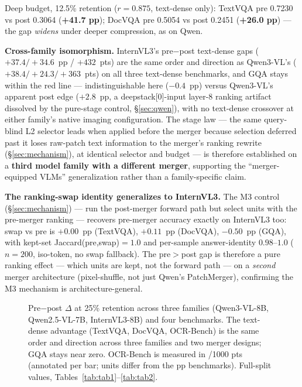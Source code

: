 \documentclass[sigconf,review,anonymous]{acmart}
\begin{document}
Deep budget, 12.5\% retention ($r = 0.875$, text-dense only): TextVQA pre 0.7230
vs post 0.3064 (\textbf{+41.7 pp}); DocVQA pre 0.5054 vs post 0.2451
(\textbf{+26.0 pp}) --- the gap \emph{widens} under deeper compression, as on
Qwen.

\textbf{Cross-family isomorphism.} InternVL3's pre$-$post text-dense gaps
($+37.4 / +34.6$~pp / $+432$~pts) are the same order and direction as
Qwen3-VL's ($+38.4 / +24.3 / +363$~pts) on all three text-dense benchmarks, and
GQA stays within the red line --- indistinguishable here ($-0.4$~pp) versus
Qwen3-VL's apparent post edge ($+2.8$~pp, a deepstack[0]-input layer-8 ranking
artifact dissolved by the pure-stage control, \S\ref{sec:qwen}), with no
text-dense crossover at either family's native imaging configuration. The stage law --- the same query-blind L2
selector leads when applied before the merger because selection deferred past it
loses raw-patch text information to the merger's ranking rewrite
(\S\ref{sec:mechanism}), at identical selector and budget --- is therefore
established on a \textbf{third model family with a different merger}, supporting
the ``merger-equipped VLMs'' generalization rather than a family-specific claim.

\textbf{The ranking-swap identity generalizes to InternVL3.} The M3 control
(\S\ref{sec:mechanism}) --- run the post-merger forward path but select units
with the pre-merger ranking --- recovers pre-merger accuracy exactly on
InternVL3 too: swap vs pre is $+0.00$~pp (TextVQA), $+0.11$~pp (DocVQA),
$-0.50$~pp (GQA), with kept-set Jaccard(pre,swap)$= 1.0$ and per-sample
answer-identity $0.98$--$1.0$ ($n=200$, iso-token, no swap fallback). The
pre$>$post gap is therefore a pure ranking effect --- which units are kept, not
the forward path --- on a \emph{second} merger architecture (pixel-shuffle, not
just Qwen's PatchMerger), confirming the M3 mechanism is architecture-general.

\begin{figure}[t]
  \centering
  \caption{Pre$-$post $\Delta$ at 25\% retention across three families
    (Qwen3-VL-8B, Qwen2.5-VL-7B, InternVL3-8B) and four benchmarks. The
    text-dense advantage (TextVQA, DocVQA, OCR-Bench) is the same order and
    direction across three families and two merger designs; GQA stays near zero.
    OCR-Bench is measured in /1000 pts (annotated per bar; units differ from the
    pp benchmarks). Full-split values, Tables~\ref{tab:tab1}--\ref{tab:tab2}.}
  \label{fig:fig2}
\end{figure}
\end{document}
